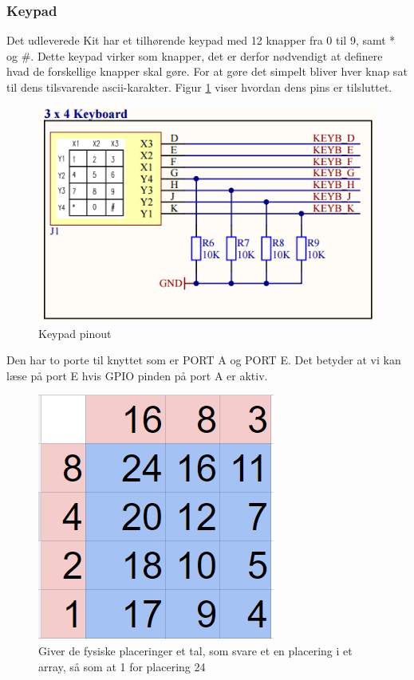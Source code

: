 \subsubsection{Keypad}

Det udleverede Kit har et tilhørende keypad med 12 knapper fra 0 til 9, samt * og \#. Dette keypad virker som knapper, det er derfor nødvendigt at definere hvad de forskellige knapper skal gøre. For at gøre det simpelt bliver hver knap sat til dens tilsvarende ascii-karakter. Figur \ref{fig:Keypadpins} viser hvordan dens pins er tilsluttet.
\begin{figure}[ht]
	\begin{center}
		\includegraphics[scale=0.7]{Billeder/Keypadpins.PNG}
	\end{center}
\caption{Keypad pinout}
\label{fig:Keypadpins}
\end{figure}
Den har to porte til knyttet som er PORT A og PORT E. Det betyder at vi kan læse på port E hvis GPIO pinden på port A er aktiv.
\begin{figure}[ht]
	\begin{center}
		\includegraphics[scale=0.7]{Billeder/Keypad.PNG}
	\end{center}
\caption{Giver de fysiske placeringer et tal, som svare et en placering i et array, så som at 1 for placering 24}
\label{fig:Keypad}
\end{figure}


